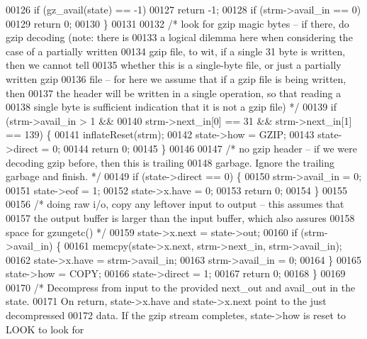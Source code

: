 \begin{DoxyCode}
00126         \textcolor{keywordflow}{if} (gz\_avail(state) == -1)
00127             \textcolor{keywordflow}{return} -1;
00128         \textcolor{keywordflow}{if} (strm->avail\_in == 0)
00129             \textcolor{keywordflow}{return} 0;
00130     \}
00131 
00132     \textcolor{comment}{/* look for gzip magic bytes -- if there, do gzip decoding (note: there is}
00133 \textcolor{comment}{       a logical dilemma here when considering the case of a partially written}
00134 \textcolor{comment}{       gzip file, to wit, if a single 31 byte is written, then we cannot tell}
00135 \textcolor{comment}{       whether this is a single-byte file, or just a partially written gzip}
00136 \textcolor{comment}{       file -- for here we assume that if a gzip file is being written, then}
00137 \textcolor{comment}{       the header will be written in a single operation, so that reading a}
00138 \textcolor{comment}{       single byte is sufficient indication that it is not a gzip file) */}
00139     \textcolor{keywordflow}{if} (strm->avail\_in > 1 &&
00140             strm->next\_in[0] == 31 && strm->next\_in[1] == 139) \{
00141         inflateReset(strm);
00142         state->how = GZIP;
00143         state->direct = 0;
00144         \textcolor{keywordflow}{return} 0;
00145     \}
00146 
00147     \textcolor{comment}{/* no gzip header -- if we were decoding gzip before, then this is trailing}
00148 \textcolor{comment}{       garbage.  Ignore the trailing garbage and finish. */}
00149     \textcolor{keywordflow}{if} (state->direct == 0) \{
00150         strm->avail\_in = 0;
00151         state->eof = 1;
00152         state->x.have = 0;
00153         \textcolor{keywordflow}{return} 0;
00154     \}
00155 
00156     \textcolor{comment}{/* doing raw i/o, copy any leftover input to output -- this assumes that}
00157 \textcolor{comment}{       the output buffer is larger than the input buffer, which also assures}
00158 \textcolor{comment}{       space for gzungetc() */}
00159     state->x.next = state->out;
00160     \textcolor{keywordflow}{if} (strm->avail\_in) \{
00161         memcpy(state->x.next, strm->next\_in, strm->avail\_in);
00162         state->x.have = strm->avail\_in;
00163         strm->avail\_in = 0;
00164     \}
00165     state->how = COPY;
00166     state->direct = 1;
00167     \textcolor{keywordflow}{return} 0;
00168 \}
00169 
00170 \textcolor{comment}{/* Decompress from input to the provided next\_out and avail\_out in the state.}
00171 \textcolor{comment}{   On return, state->x.have and state->x.next point to the just decompressed}
00172 \textcolor{comment}{   data.  If the gzip stream completes, state->how is reset to LOOK to look for}

\end{DoxyCode}
